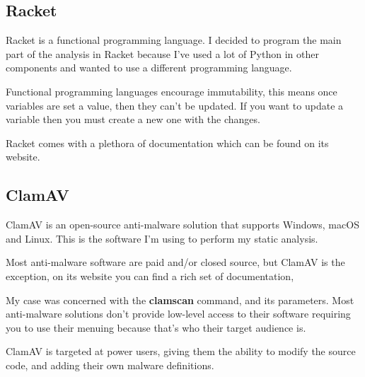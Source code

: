 \subsection{Racket}
Racket is a functional programming language.
I decided to program the main part of the analysis in Racket
because I've used a lot of Python in other components and
wanted to use a different programming language.

Functional programming languages encourage immutability,
this means once variables are set a value, then they can't be updated.
If you want to update a variable then you must create a new one with
the changes.

Racket comes with a plethora of documentation which can be found on its website.

\subsection{ClamAV}
ClamAV is an open-source anti-malware solution that
supports Windows, macOS and Linux.
This is the software I'm using to perform my static analysis.

Most anti-malware software are paid and/or closed source,
but ClamAV is the exception, on its website you can find a rich set of documentation,

My case was concerned with the \textbf{clamscan} command, and its parameters.
Most anti-malware solutions don't provide low-level access to their software
requiring you to use their menuing because that's who their target audience is.

ClamAV is targeted at power users,
giving them the ability to modify the source code,
and adding their own malware definitions.
